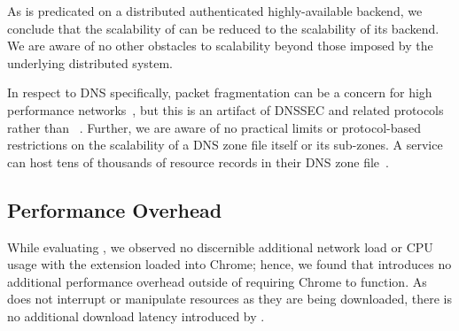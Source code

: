 As \SYSTEM{} is predicated on a distributed authenticated highly-available
backend, we conclude that the scalability of \SYSTEM{} can be reduced to the
scalability of its backend. We are aware of no other obstacles to scalability
beyond those imposed by the underlying distributed system.

In respect to DNS specifically, packet fragmentation can be a concern for high
performance networks~\cite{EDNS}, but this is an artifact of DNSSEC and related
protocols rather than \SYSTEM{}~\cite{DNSSEC}. Further, we are aware of no
practical limits or protocol-based restrictions on the scalability of a DNS zone
file itself or its sub-zones. A service can host tens of thousands of resource
records in their DNS zone file~\cite{DNS1, DNS2}.

\subsection{Performance Overhead}

While evaluating \SYSTEM{}, we observed no discernible additional network load
or CPU usage with the extension loaded into Chrome; hence, we found that
\SYSTEM{} introduces no additional performance overhead outside of requiring
Chrome to function. As \SYSTEM{} does not interrupt or manipulate resources as
they are being downloaded, there is no additional download latency introduced by
\SYSTEM{}.
